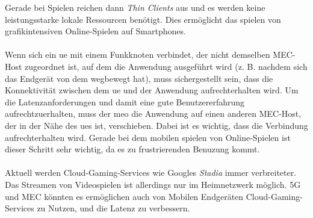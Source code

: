 \documentclass[runningheads]{llncs}
\numberwithin{figure}{section}
\begin{document}
Gerade bei Spielen reichen dann \textit{Thin Clients} aus und es werden keine leistungsstarke lokale Ressourcen benötigt. 
Dies ermöglicht das spielen von grafikintensiven Online-Spielen auf Smartphones. \cite{chinamobileztePoweredSA5G}
\\
\\
Wenn sich ein \acrshort{ue} mit einem Funkknoten verbindet, der nicht demselben MEC-Host zugeordnet ist, 
auf dem die Anwendung ausgeführt wird (z. B. nachdem sich das Endgerät von dem wegbewegt hat), 
muss sichergestellt sein, dass die Konnektivität zwischen dem \acrshort{ue} und der Anwendung aufrechterhalten wird. 
Um die Latenzanforderungen und damit eine gute Benutzererfahrung aufrechtzuerhalten, 
muss der \acrshort{meo} die Anwendung auf einen anderen MEC-Host, der in der Nähe des \acrshort{ue}s ist, verschieben. 
Dabei ist es wichtig, dass die Verbindung aufrechterhalten wird. Gerade bei dem mobilen spielen von Online-Spielen
ist dieser Schritt sehr wichtig, da es zu frustrierenden Benuzung kommt. \cite{etsiETSIGSMEC} 
\\
\\
Aktuell werden Cloud-Gaming-Services wie Googles \textit{Stadia} immer verbreiteter. Das Streamen von Videospielen ist
allerdings nur im Heimnetzwerk möglich. 5G und MEC könnten es ermöglichen auch von Mobilen Endgeräten Cloud-Gaming-Services zu Nutzen,
und die Latenz zu verbessern. \cite{etsiMultiaccessEdgeComputing}
\end{document}
